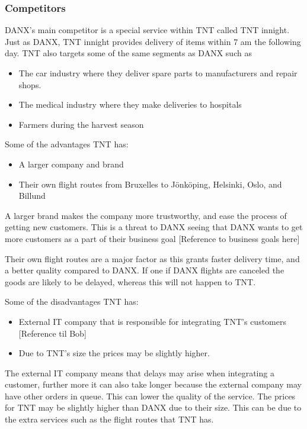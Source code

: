 \subsubsection{Competitors}
DANX’s main competitor is a special service within TNT called TNT innight.
Just as DANX, TNT innight provides delivery of items within 7 am the following day.
TNT also targets some of the same segments as DANX such as 

\begin{itemize}
\item The car industry where they deliver spare parts to manufacturers and repair shops.
\item The medical industry where they make deliveries to hospitals
\item Farmers during the harvest season
\end{itemize}

Some of the advantages TNT has:
\begin{itemize}
\item A larger company and brand
\item Their own flight routes from Bruxelles to Jönköping, Helsinki, Oslo, and Billund
\end{itemize}

A larger brand makes the company more trustworthy, and ease the process of getting new customers. This is a threat to DANX seeing that DANX wants to get more customers as a part of their business goal [Reference to business goals here]

Their own flight routes are a major factor as this grants faster delivery time, and a better quality compared to DANX. If one if DANX flights are canceled the goods are likely to be delayed, whereas this will not happen to TNT.

Some of the disadvantages TNT has:
\begin{itemize}
\item External IT company that is responsible for integrating TNT’s customers [Reference til Bob]
\item Due to TNT’s size the prices may be slightly higher.
\end{itemize}

The external IT company means that delays may arise when integrating a customer, further more it can also take longer because the external company may have other orders in queue. This can lower the quality of the service.
The prices for TNT may be slightly higher than DANX due to their size. This can be due to the extra services such as the flight routes that TNT has. \\


